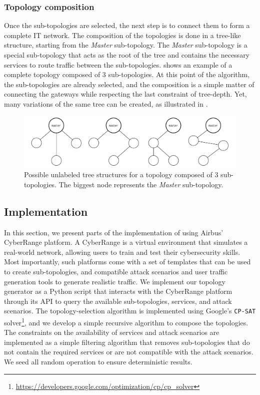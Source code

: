 \subsubsection{Topology composition}

Once the sub-topologies are selected, the next step is to connect them to form a complete IT network.
The composition of the topologies is done in a tree-like structure, starting from the \emph{Master} sub-topology.
The \emph{Master} sub-topology is a special sub-topology that acts as the root of the tree and contains the necessary services to route traffic between the sub-topologies.
 shows an example of a complete topology composed of 3 sub-topologies.
At this point of the algorithm, the sub-topologies are already selected, and the composition is a simple matter of connecting the gateways while respecting the last constraint of tree-depth.
Yet, many variations of the same tree can be created, as illustrated in .

\begin{figure}
  \centering
  \includegraphics[width=0.9\linewidth]{figures/trees-3.pdf}
  \caption{
    Possible unlabeled tree structures for a topology composed of 3 sub-topologies.
    The biggest node represents the \emph{Master} sub-topology.
    \label{fig:topologies.trees}
  }
\end{figure}

\subsection{Implementation\label{sec:topologies.approach.implementation}}

In this section, we present parts of the implementation of \thecontrib using Airbus' CyberRange platform.
A CyberRange is a virtual environment that simulates a real-world network, allowing users to train and test their cybersecurity skills.
Most importantly, such platforms come with a set of templates that can be used to create sub-topologies, and compatible attack scenarios and user traffic generation tools to generate realistic traffic.
We implement our topology generator as a Python script that interacts with the CyberRange platform through its API to query the available sub-topologies, services, and attack scenarios.
The topology-selection algorithm is implemented using Google's \texttt{CP-SAT} solver\footnote{\url{https://developers.google.com/optimization/cp/cp_solver}}, and we develop a simple recursive algorithm to compose the topologies.
The constraints on the availability of services and attack scenarios are implemented as a simple filtering algorithm that removes sub-topologies that do not contain the required services or are not compatible with the attack scenarios.
We seed all random operation to ensure deterministic results.


